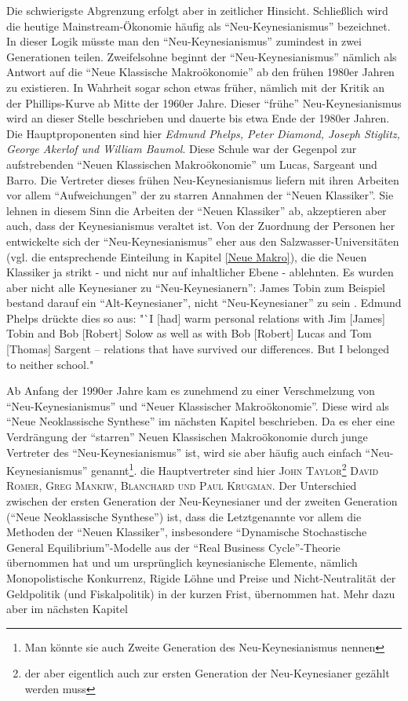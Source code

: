 Die schwierigste Abgrenzung erfolgt aber in zeitlicher Hinsicht. Schließlich wird die heutige Mainstream-Ökonomie häufig als "`Neu-Keynesianismus"' bezeichnet. In dieser Logik müsste man den "`Neu-Keynesianismus"' zumindest in zwei Generationen teilen. Zweifelsohne beginnt der "`Neu-Keynesianismus"' nämlich als Antwort auf die "`Neue Klassische Makroökonomie"' ab den frühen 1980er Jahren zu existieren. In Wahrheit sogar schon etwas früher, nämlich mit der Kritik an der Phillips-Kurve ab Mitte der 1960er Jahre. Dieser "`frühe"' Neu-Keynesianismus wird an dieser Stelle beschrieben und dauerte bis etwa Ende der 1980er Jahren. Die Hauptproponenten sind hier \textit{Edmund Phelps, Peter Diamond, Joseph Stiglitz, George Akerlof und William Baumol}. Diese Schule war der Gegenpol zur aufstrebenden "`Neuen Klassischen Makroökonomie"' um Lucas, Sargeant und Barro. Die Vertreter dieses frühen Neu-Keynesianismus liefern mit ihren Arbeiten vor allem "`Aufweichungen"' der zu starren Annahmen der "`Neuen Klassiker"'. Sie lehnen in diesem Sinn die Arbeiten der "`Neuen Klassiker"' ab, akzeptieren aber auch, dass der Keynesianismus veraltet ist. Von der Zuordnung der Personen her entwickelte sich der "`Neu-Keynesianismus"' eher aus den Salzwasser-Universitäten (vgl. die entsprechende Einteilung in Kapitel \ref{Neue Makro}), die die Neuen Klassiker ja strikt - und nicht nur auf inhaltlicher Ebene - ablehnten. Es wurden aber nicht alle Keynesianer zu "`Neu-Keynesianern"': James Tobin zum Beispiel bestand darauf ein "`Alt-Keynesianer"', nicht  "`Neu-Keynesianer"' zu sein \parencite[S. 45ff]{Tobin1993}. Edmund Phelps drückte dies so aus: "`I [had] warm personal relations with Jim [James] Tobin and Bob [Robert] Solow as well as with Bob [Robert] Lucas and Tom [Thomas] Sargent – relations that have survived our differences. But I belonged to neither school." \parencite{Phelps2006}


Ab Anfang der 1990er Jahre kam es zunehmend zu einer Verschmelzung von "`Neu-Keynesianismus"' und "`Neuer Klassischer Makroökonomie"'. Diese wird als "`Neue Neoklassische Synthese"' im nächsten Kapitel beschrieben. Da es eher eine Verdrängung der "`starren"' Neuen Klassischen Makroökonomie durch junge Vertreter des "`Neu-Keynesianismus"' ist, wird sie aber häufig auch einfach "`Neu-Keynesianismus"' genannt\footnote{Man könnte sie auch Zweite Generation des Neu-Keynesianismus nennen}. die Hauptvertreter sind hier \textsc{John Taylor}\footnote{der aber eigentlich auch zur ersten Generation der Neu-Keynesianer gezählt werden muss} \textsc{David Romer, Greg Mankiw, Blanchard und Paul Krugman}. Der Unterschied zwischen der ersten Generation der Neu-Keynesianer und der zweiten Generation ("`Neue Neoklassische Synthese"') ist, dass die Letztgenannte vor allem die Methoden der "`Neuen Klassiker"', insbesondere "`Dynamische Stochastische General Equilibrium"'-Modelle aus der "`Real Business Cycle"'-Theorie übernommen hat und um ursprünglich keynesianische Elemente, nämlich Monopolistische Konkurrenz, Rigide Löhne und Preise und Nicht-Neutralität der Geldpolitik (und Fiskalpolitik) in der kurzen Frist, übernommen hat. Mehr dazu aber im nächsten Kapitel

